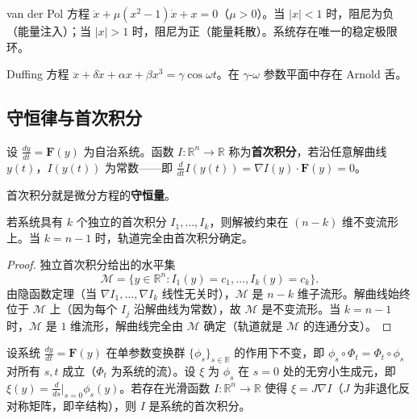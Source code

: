 \begin{example}\label{ex:van_der_pol}
van der Pol 方程 $\ddot{x} + \mu(x^2-1)\dot{x} + x = 0$（$\mu > 0$）。当 $|x| < 1$ 时，阻尼为负（能量注入）；当 $|x| > 1$ 时，阻尼为正（能量耗散）。系统存在唯一的稳定极限环。
\end{example}

\begin{example}\label{ex:duffing}
Duffing 方程 $\ddot{x} + \delta \dot{x} + \alpha x + \beta x^3 = \gamma \cos \omega t$。在 $\gamma$-$\omega$ 参数平面中存在 Arnold 舌。
\end{example}

\subsection{守恒律与首次积分}\label{sec:first_integrals}

\begin{definition}[首次积分]\label{def:first_integral}
设 $\frac{dy}{dt} = \mathbf{F}(y)$ 为自治系统。函数 $I: \mathbb{R}^n \to \mathbb{R}$ 称为\textbf{首次积分}，若沿任意解曲线 $y(t)$，$I(y(t))$ 为常数——即 $\frac{d}{dt} I(y(t)) = \nabla I(y) \cdot \mathbf{F}(y) = 0$。

首次积分就是微分方程的\textbf{守恒量}。
\end{definition}

\begin{proposition}[首次积分与轨道约束]\label{prop:first_integral_orbit}
若系统具有 $k$ 个独立的首次积分 $I_1, \dots, I_k$，则解被约束在 $(n-k)$ 维不变流形上。当 $k = n-1$ 时，轨道完全由首次积分确定。
\end{proposition}

\begin{proof}
独立首次积分给出的水平集
\[
\mathcal{M} = \{y \in \mathbb{R}^n : I_1(y) = c_1, \dots, I_k(y) = c_k\}.
\]
由隐函数定理（当 $\nabla I_1, \dots, \nabla I_k$ 线性无关时），$\mathcal{M}$ 是 $n-k$ 维子流形。解曲线始终位于 $\mathcal{M}$ 上（因为每个 $I_j$ 沿解曲线为常数），故 $\mathcal{M}$ 是不变流形。当 $k = n-1$ 时，$\mathcal{M}$ 是 $1$ 维流形，解曲线完全由 $\mathcal{M}$ 确定（轨道就是 $\mathcal{M}$ 的连通分支）。
\end{proof}

\begin{proposition}\label{prop:noether_ode}
设系统 $\frac{dy}{dt} = \mathbf{F}(y)$ 在单参数变换群 $\{\phi_s\}_{s \in \mathbb{R}}$ 的作用下不变，即 $\phi_s \circ \Phi_t = \Phi_t \circ \phi_s$ 对所有 $s, t$ 成立（$\Phi_t$ 为系统的流）。设 $\xi$ 为 $\phi_s$ 在 $s=0$ 处的无穷小生成元，即 $\xi(y) = \frac{d}{ds}\big|_{s=0} \phi_s(y)$。若存在光滑函数 $I: \mathbb{R}^n \to \mathbb{R}$ 使得 $\xi = J \nabla I$（$J$ 为非退化反对称矩阵，即辛结构），则 $I$ 是系统的首次积分。
\end{proposition}

